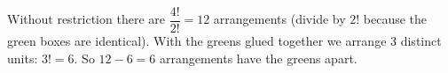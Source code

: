 Without restriction there are $\dfrac{4!}{2!}=12$ arrangements (divide by $2!$ because the green boxes are identical). With the greens glued together we arrange $3$ distinct units: $3!=6$. So $12-6=\boxed{6}$ arrangements have the greens apart.
